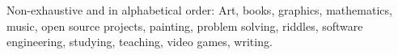 \documentclass[10pt,a4paper]{article} %
\begin{document}


\inlineheadsection %
{Non-exhaustive and in alphabetical order:}
{Art,
books,
graphics,
mathematics,
music,
open source projects,
painting,
problem solving,
riddles,
software engineering,
studying,
teaching,
video games,
writing.}
{}

\end{document}
